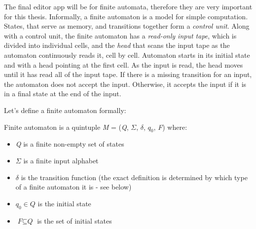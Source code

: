 The final editor app will be for finite automata, therefore they are very important for this thesis. Informally, a finite automaton is a model for simple computation. States, that serve as memory, and transitions together form a \textit{control unit}. Along with a control unit, the finite automaton has a \textit{read-only input tape}, which is divided into individual cells, and the \textit{head} that scans the input tape as the automaton continuously reads it, cell by cell. Automaton starts in its initial state and with a head pointing at the first cell. As the input is read, the head moves until it has read all of the input tape. If there is a missing transition for an input, the automaton does not accept the input. Otherwise, it accepts the input if it is in a final state at the end of the input.

Let's define a finite automaton formally:
\begin{definition}
    Finite automaton is a quintuple \textit{M} = (\textit{Q}, $\Sigma$, $\delta$, $\textit{q}_0$, \textit{F}) where:
    \begin{itemize}
        \item \textit{Q} is a finite non-empty set of states
        \item $\Sigma$ is a finite input alphabet
        \item $\delta$ is the transition function (the exact definition is determined by which type of a finite automaton it is - see below)
        \item $\textit{q}_0 \in \textit{Q}$ is the initial state
        \item $\textit{F} \subseteq \textit{Q}$ is the set of initial states
    \end{itemize}
\end{definition}

